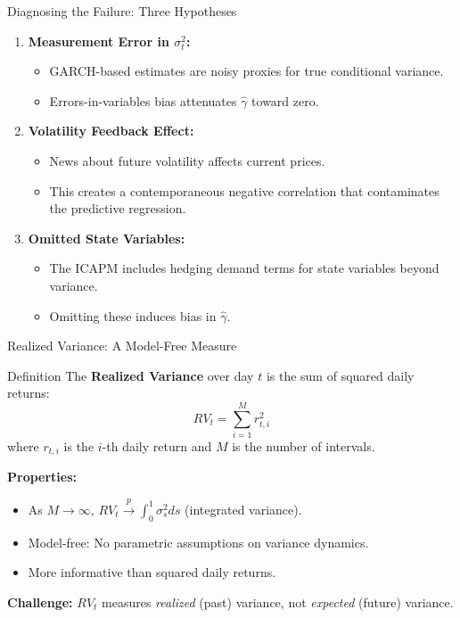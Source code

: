 \documentclass{beamer}
\begin{document}
\begin{frame}{Diagnosing the Failure: Three Hypotheses}
    \begin{enumerate}
        \item \textbf{Measurement Error in $\sigma_t^2$:}
            \begin{itemize}
                \item GARCH-based estimates are noisy proxies for true conditional variance.
                \item Errors-in-variables bias attenuates $\hat{\gamma}$ toward zero.
            \end{itemize}
        \item \textbf{Volatility Feedback Effect:}
            \begin{itemize}
                \item News about future volatility affects current prices.
                \item This creates a contemporaneous negative correlation that contaminates the predictive regression.
            \end{itemize}
        \item \textbf{Omitted State Variables:}
            \begin{itemize}
                \item The ICAPM includes hedging demand terms for state variables beyond variance.
                \item Omitting these induces bias in $\hat{\gamma}$.
            \end{itemize}
    \end{enumerate}
\end{frame}


\begin{frame}{Realized Variance: A Model-Free Measure}
    \begin{block}{Definition}
        The \textbf{Realized Variance} over day $t$ is the sum of squared daily returns:
        \begin{equation}\label{equ: RV}
            RV_t = \sum_{i=1}^{M} r_{t,i}^2
        \end{equation}
        where $r_{t,i}$ is the $i$-th daily return and $M$ is the number of intervals.
    \end{block}
    
    \textbf{Properties:}
    \begin{itemize}
        \item As $M \to \infty$, $RV_t \xrightarrow{p} \int_0^1 \sigma_s^2 ds$ (integrated variance).
        \item Model-free: No parametric assumptions on variance dynamics.
        \item More informative than squared daily returns.
    \end{itemize}
    
    \textbf{Challenge:} $RV_t$ measures \textit{realized} (past) variance, not \textit{expected} (future) variance.
\end{frame}
\end{document}
